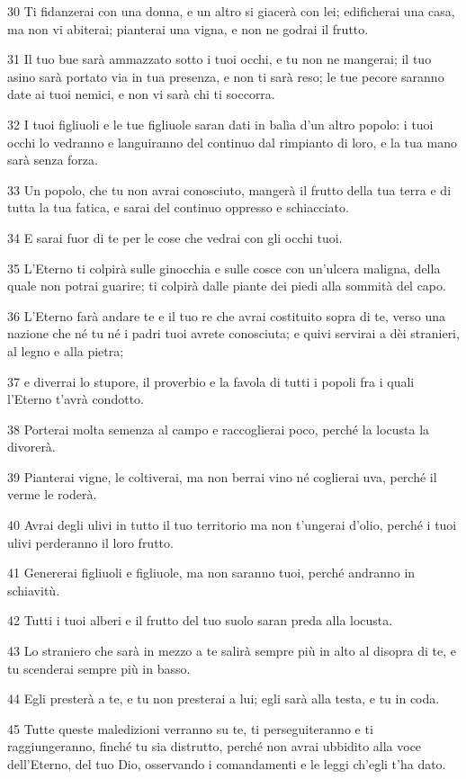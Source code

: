 \par 30 Ti fidanzerai con una donna, e un altro si giacerà con lei; edificherai una casa, ma non vi abiterai; pianterai una vigna, e non ne godrai il frutto.
\par 31 Il tuo bue sarà ammazzato sotto i tuoi occhi, e tu non ne mangerai; il tuo asino sarà portato via in tua presenza, e non ti sarà reso; le tue pecore saranno date ai tuoi nemici, e non vi sarà chi ti soccorra.
\par 32 I tuoi figliuoli e le tue figliuole saran dati in balìa d'un altro popolo: i tuoi occhi lo vedranno e languiranno del continuo dal rimpianto di loro, e la tua mano sarà senza forza.
\par 33 Un popolo, che tu non avrai conosciuto, mangerà il frutto della tua terra e di tutta la tua fatica, e sarai del continuo oppresso e schiacciato.
\par 34 E sarai fuor di te per le cose che vedrai con gli occhi tuoi.
\par 35 L'Eterno ti colpirà sulle ginocchia e sulle cosce con un'ulcera maligna, della quale non potrai guarire; ti colpirà dalle piante dei piedi alla sommità del capo.
\par 36 L'Eterno farà andare te e il tuo re che avrai costituito sopra di te, verso una nazione che né tu né i padri tuoi avrete conosciuta; e quivi servirai a dèi stranieri, al legno e alla pietra;
\par 37 e diverrai lo stupore, il proverbio e la favola di tutti i popoli fra i quali l'Eterno t'avrà condotto.
\par 38 Porterai molta semenza al campo e raccoglierai poco, perché la locusta la divorerà.
\par 39 Pianterai vigne, le coltiverai, ma non berrai vino né coglierai uva, perché il verme le roderà.
\par 40 Avrai degli ulivi in tutto il tuo territorio ma non t'ungerai d'olio, perché i tuoi ulivi perderanno il loro frutto.
\par 41 Genererai figliuoli e figliuole, ma non saranno tuoi, perché andranno in schiavitù.
\par 42 Tutti i tuoi alberi e il frutto del tuo suolo saran preda alla locusta.
\par 43 Lo straniero che sarà in mezzo a te salirà sempre più in alto al disopra di te, e tu scenderai sempre più in basso.
\par 44 Egli presterà a te, e tu non presterai a lui; egli sarà alla testa, e tu in coda.
\par 45 Tutte queste maledizioni verranno su te, ti perseguiteranno e ti raggiungeranno, finché tu sia distrutto, perché non avrai ubbidito alla voce dell'Eterno, del tuo Dio, osservando i comandamenti e le leggi ch'egli t'ha dato.
